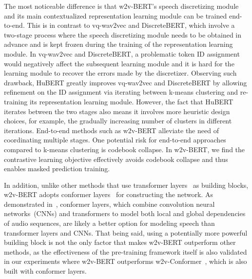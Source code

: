 \documentclass{article}
\begin{document}
The most noticeable difference is that w2v-BERT's speech discretizing module and its main contextualized representation learning module can be trained end-to-end.
This is in contrast to vq-wav2vec and DiscreteBERT, which involve a two-stage process where the speech discretizing module needs to be obtained in advance and is kept frozen during the training of the representation learning module.
In vq-wav2vec and DiscreteBERT, a problematic token ID assignment would negatively affect the subsequent learning module and it is hard for the learning module to recover the errors made by the discretizer.
Observing such drawback, HuBERT greatly improves vq-wav2vec and DiscreteBERT by allowing refinement on the ID assignment via iterating between k-means clustering and re-training its representation learning module. 
However, the fact that HuBERT iterates between the two stages also means it involves more heuristic design choices, for example, the gradually increasing number of clusters in different iterations.
End-to-end methods such as w2v-BERT alleviate the need of coordinating multiple stages.
One potential risk for end-to-end approaches compared to k-means clustering is codebook collapse.
In w2v-BERT, we find the contrastive learning objective effectively avoids codebook collapse and thus enables masked prediction training.

In addition, unlike other methods that use transformer layers~\cite{vaswani2017attention} as building blocks, w2v-BERT adopts conformer layers~\cite{gulati2020conformer} for constructing the network.
As demonstrated in~\cite{gulati2020conformer}, conformer layers, which combine convolution neural networks~(CNNs) and transformers to model both local and global dependencies of audio sequences, are likely a better option for modeling speech than transformer layers and CNNs.
That being said, using a potentially more powerful building block is not the only factor that makes w2v-BERT outperform other methods, as the effectiveness of the pre-training framework itself is also validated in our experiments where w2v-BERT outperforms w2v-Conformer~\cite{zhang2020pushing}, which is also built with conformer layers.
\end{document}
